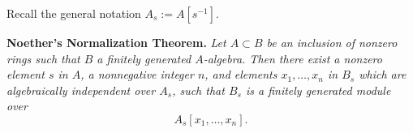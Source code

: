 \documentclass[parskip=half,fontsize=12pt]{scrartcl}%
\begin{document}

Recall the general notation $A_s:=A[s^{-1}]$.%

\textbf{Noether's Normalization Theorem.} \emph{Let $A\subset B$ be an inclusion of nonzero rings such that $B$ a finitely generated $A$-algebra. Then there exist a nonzero element $s$ in $A$, a nonnegative integer $n$, and elements $x_1,\dots,x_n$ in $B_s$ which are algebraically independent over $A_s$, such that $B_s$ is a finitely generated module over} 
$$
A_s[x_1,\dots,x_n].
$$ 
\end{document}
